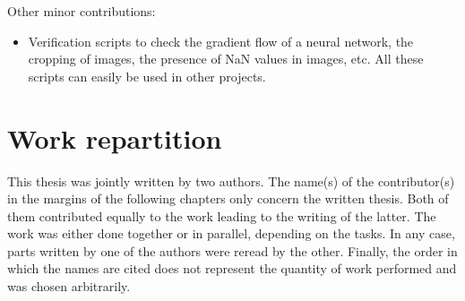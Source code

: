 Other minor contributions:
\begin{itemize}
\item Verification scripts to check the gradient flow of a neural network, the cropping of images, the presence of NaN values in images, etc. All these scripts can easily be used in other projects.
\end{itemize}


\section{Work repartition}
This thesis was jointly written by two authors. The name(s) of the contributor(s) in the margins of the following chapters only concern the written thesis. Both of them contributed equally to the work leading to the writing of the latter. The work was either done together or in parallel, depending on the tasks. In any case, parts written by one of the authors were reread by the other. Finally, the order in which the names are cited does not represent the quantity of work performed and was chosen arbitrarily. 